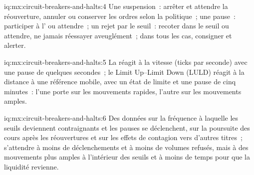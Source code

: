 \begin{solution}{iq:mx:circuit-breakers-and-halts:4}
Une suspension~: arrêter et attendre la réouverture, annuler ou conserver les ordres selon la politique~; une pause~: participer à l' ou attendre~; un rejet par le seuil~:
recoter dans le seuil ou attendre, ne jamais réessayer aveuglément~; dans tous les cas, consigner et alerter.
\end{solution}

\begin{solution}{iq:mx:circuit-breakers-and-halts:5}
La  réagit à la vitesse (ticks par seconde) avec une pause de quelques secondes~; le Limit Up--Limit Down (LULD) réagit à la distance à une référence mobile, avec un
état de limite et une pause de cinq minutes~: l'une porte sur les mouvements rapides, l'autre sur les mouvements amples.
\end{solution}

\begin{solution}{iq:mx:circuit-breakers-and-halts:6}
Des données sur la fréquence à laquelle les seuils deviennent contraignants et les pauses se déclenchent, sur la poursuite des cours après les réouvertures et sur les effets de contagion vers d'autres titres~; s'attendre à moins de déclenchements
et à moins de volumes refusés, mais à des mouvements plus amples à l'intérieur des seuils et à moins de temps pour que la liquidité revienne.
\end{solution}
